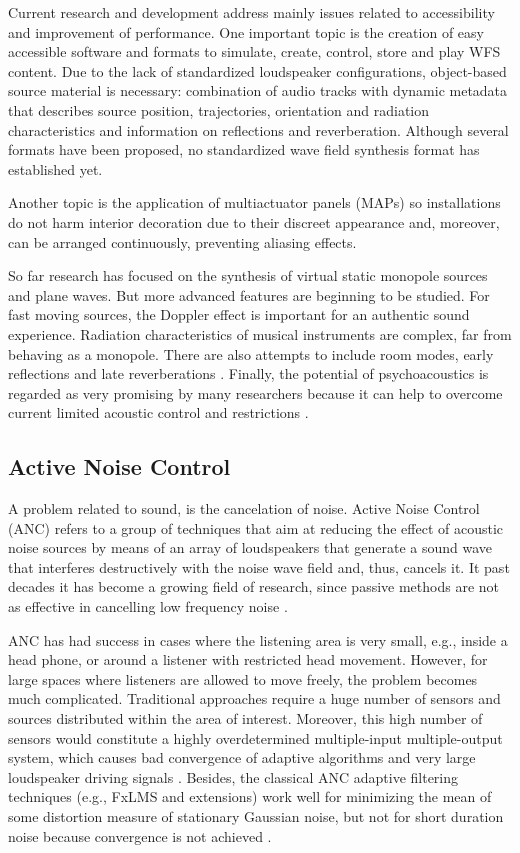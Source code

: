 Current research and development address mainly issues related to accessibility and improvement of performance. One important topic is the creation of easy accessible software and formats to simulate, create, control, store and play WFS content. Due to the lack of standardized loudspeaker configurations, object-based source material is necessary: combination of audio tracks with dynamic metadata that describes source position, trajectories, orientation and radiation characteristics and information on reflections and reverberation. Although several formats have been proposed, no standardized wave field synthesis format has established yet.

Another topic is the application of multiactuator panels (MAPs) so installations do not harm interior decoration due to their discreet appearance and, moreover, can be arranged continuously, preventing aliasing effects.

So far research has focused on the synthesis of virtual static monopole sources and plane waves. But more advanced features are beginning to be studied. For fast moving sources, the Doppler effect is important for an authentic sound experience. Radiation characteristics of musical instruments are complex, far from behaving as a monopole. There are also attempts to include room modes, early reflections and late reverberations \cite{Ahrens2014}. Finally, the potential of psychoacoustics is regarded as very promising by many researchers because it can help to overcome current limited acoustic control and restrictions \cite{Musicology}.

\subsection{Active Noise Control}
A problem related to sound, is the cancelation of noise. Active Noise Control (ANC) refers to a group of techniques that aim at reducing the effect of acoustic noise sources by means of an array of loudspeakers that generate a sound wave that interferes destructively with the noise wave field and, thus, cancels it. It past decades it has become a growing field of research, since passive methods are not as effective in cancelling low frequency noise \cite{Lapini2016}.

ANC has had success in cases where the listening area is very small, e.g., inside a head phone, or around a listener with restricted head movement. However, for large spaces where listeners are allowed to move freely, the problem becomes much complicated. Traditional approaches require a huge number of sensors and sources distributed within the area of interest. Moreover, this high number of sensors would constitute a highly overdetermined multiple-input multiple-output system, which causes bad convergence of adaptive algorithms and very large loudspeaker driving signals \cite{Kuntz2004}. Besides, the classical ANC adaptive filtering techniques (e.g., FxLMS and extensions) work well for minimizing the mean of some distortion measure of stationary Gaussian noise, but not for short duration noise because convergence is not achieved \cite{Lapini2016}.

